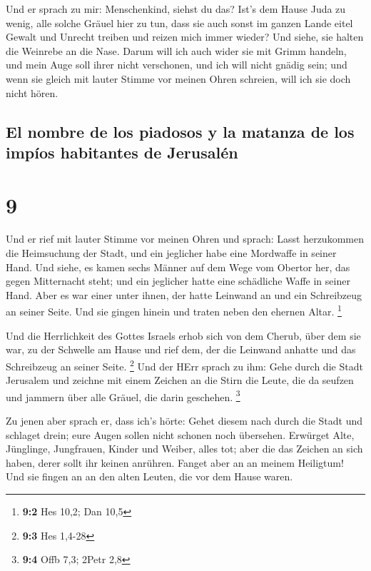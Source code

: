  Und er sprach zu mir: Menschenkind, siehst du das? Ist's
dem Hause Juda zu wenig, alle solche Gräuel hier zu tun, dass sie auch
sonst im ganzen Lande eitel Gewalt und Unrecht treiben und reizen mich
immer wieder? Und siehe, sie halten die Weinrebe an die Nase.
 Darum will ich auch wider sie mit Grimm handeln, und
mein Auge soll ihrer nicht verschonen, und ich will nicht gnädig sein;
und wenn sie gleich mit lauter Stimme vor meinen Ohren schreien, will
ich sie doch nicht hören.

\hypertarget{el-nombre-de-los-piadosos-y-la-matanza-de-los-impuxedos-habitantes-de-jerusaluxe9n}{%
\subsection{El nombre de los piadosos y la matanza de los impíos
habitantes de
Jerusalén}\label{el-nombre-de-los-piadosos-y-la-matanza-de-los-impuxedos-habitantes-de-jerusaluxe9n}}

\hypertarget{section-8}{%
\section{9}\label{section-8}}

 Und er rief mit lauter Stimme vor meinen Ohren und
sprach: Lasst herzukommen die Heimsuchung der Stadt, und ein jeglicher
habe eine Mordwaffe in seiner Hand.  Und siehe, es kamen
sechs Männer auf dem Wege vom Obertor her, das gegen Mitternacht steht;
und ein jeglicher hatte eine schädliche Waffe in seiner Hand. Aber es
war einer unter ihnen, der hatte Leinwand an und ein Schreibzeug an
seiner Seite. Und sie gingen hinein und traten neben den ehernen Altar.
\footnote{\textbf{9:2} Hes 10,2; Dan 10,5}

 Und die Herrlichkeit des Gottes Israels erhob sich von
dem Cherub, über dem sie war, zu der Schwelle am Hause und rief dem, der
die Leinwand anhatte und das Schreibzeug an seiner Seite. \footnote{\textbf{9:3}
  Hes 1,4-28}  Und der HErr sprach zu ihm: Gehe durch die
Stadt Jerusalem und zeichne mit einem Zeichen an die Stirn die Leute,
die da seufzen und jammern über alle Gräuel, die darin geschehen.
\footnote{\textbf{9:4} Offb 7,3; 2Petr 2,8}

 Zu jenen aber sprach er, dass ich's hörte: Gehet diesem
nach durch die Stadt und schlaget drein; eure Augen sollen nicht schonen
noch übersehen.  Erwürget Alte, Jünglinge, Jungfrauen,
Kinder und Weiber, alles tot; aber die das Zeichen an sich haben, derer
sollt ihr keinen anrühren. Fanget aber an an meinem Heiligtum! Und sie
fingen an an den alten Leuten, die vor dem Hause waren.

